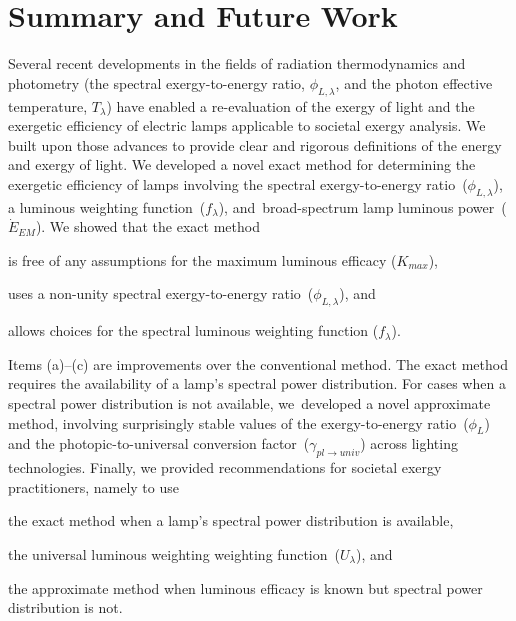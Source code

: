 \documentclass[energies,article,accept,moreauthors,pdftex]{Definitions/mdpi}\usepackage[]{graphicx}\usepackage[]{color}
\newcommand{\gammarat}{\gamma_{pl\rightarrow{}univ}}
\begin{document}
\section{Summary and Future Work}
\label{sec:conclusions}


Several recent developments in the 
fields of radiation thermodynamics and photometry
(the spectral exergy-to-energy ratio, $\phi_{L,\lambda}$, and 
the photon effective temperature, $T_\lambda$) 
have enabled
a re-evaluation of the exergy of light and the exergetic efficiency of electric lamps
applicable to societal exergy analysis.
We built upon those advances to provide 
clear and rigorous definitions of the energy and exergy of light.
We developed a novel exact method for determining the exergetic efficiency of lamps
involving the 
spectral exergy-to-energy ratio~($\phi_{L,\lambda}$), 
a luminous weighting function~($f_\lambda$), \mbox{and 
broad-spectrum} lamp luminous power~($\dot{E}_{EM}$).
We showed that the exact method
%
\begin{enumerate*}[label={(\alph*)}]

  \item is free of any assumptions for the maximum luminous efficacy ($K_{max}$),

  \item uses a non-unity spectral exergy-to-energy ratio~($\phi_{L,\lambda}$), and

  \item allows choices for the spectral luminous weighting function ($f_\lambda$).

\end{enumerate*}
%
Items (a)--(c) are improvements over the conventional method.
The exact method requires the availability of a lamp's spectral power distribution.
For cases when a spectral power distribution is not available, 
\mbox{we developed} a novel approximate method,
involving surprisingly stable values 
of the exergy-to-energy ratio~($\phi_L$) and 
the photopic-to-universal conversion factor~($\gammarat{}$)
across lighting technologies.
Finally, we provided recommendations for societal exergy practitioners, namely to use
%
\begin{enumerate*}[label={(\alph*)}]

  \item the exact method when a lamp's spectral power distribution is available, 

  \item the universal luminous weighting weighting function~($U_\lambda$), and

  \item the approximate method when luminous efficacy is known
        but spectral power distribution is not.

\end{enumerate*}
\end{document}
